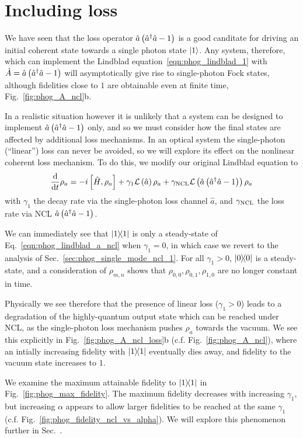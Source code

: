 \clearpage
\section{Including loss}
We have seen that the loss operator $\hat{a}\left(\hat{a}^\dagger \hat{a} - 1\right)$ is a good canditate for driving an initial coherent state towards a single photon state $\ket{1}$. Any system, therefore, which can implement the Lindblad equation~\ref{eqn:phog_lindblad_1} with $\hat{A} = \hat{a}\left(\hat{a}^\dagger \hat{a} - 1\right)$ will asymptotically give rise to single-photon Fock states, although fidelities close to $1$ are obtainable even at finite time, Fig.~\ref{fig:phog_A_ncl}b. 

In a realistic situation however it is unlikely that a system can be designed to implement $\hat{a}\left(\hat{a}^\dagger \hat{a} - 1\right)$ only, and so we must consider how the final states are affected by additional loss mechanisms. In an optical system the single-photon (``linear'') loss can never be avoided, so we will explore its effect on the nonlinear coherent loss mechanism.  To do this, we modify our original Lindblad equation to
\begin{equation}\label{eqn:phog_lindblad_a_ncl}
\frac{\mathrm{d}}{\mathrm{d}t} \rho_a =  - i \left[ \hat{H}, \rho_a\right] + \gamma_1 \mathcal{L}\left(\hat{a}\right)\rho_a + \gamma_{\text{NCL}} \mathcal{L}\left(\hat{a}\left(\hat{a}^\dagger \hat{a} - 1\right)\right)\rho_a
\end{equation}
with $\gamma_1$ the decay rate via the single-photon loss channel $\hat{a}$, and $\gamma_{\text{NCL}}$ the loss rate via NCL $\hat{a}\left(\hat{a}^\dagger \hat{a} - 1\right)$.

We can immediately see that $\dyad{1}$ is only a steady-state of Eq.~\ref{eqn:phog_lindblad_a_ncl} when $\gamma_1 = 0$, in which case we revert to the analysis of Sec.~\ref{sec:phog_single_mode_ncl_1}. For all $\gamma_1 > 0$, $\dyad{0}$ is a steady-state, and a consideration of $\rho_{m, n}$ shows that $\rho_{0, 0}, \rho_{0, 1}, \rho_{1, 0}$ are no longer constant in time. 

Physically we see therefore that the presence of linear loss ($\gamma_1 > 0$) leads to a degradation of the highly-quantum output state which can be reached under NCL, as the single-photon loss mechanism pushes $\rho_a$ towards the vacuum. We see this explicitly in Fig.~\ref{fig:phog_A_ncl_loss}b (c.f. Fig.~\ref{fig:phog_A_ncl}), where an intially increasing fidelity with $\dyad{1}$ eventually dies away, and fidelity to the vacuum state increases to $1$. 

We examine the maximum attainable fidelity to $\dyad{1}$ in Fig.~\ref{fig:phog_max_fidelity}. The maximum fidelity decreases with increasing $\gamma_1$, but increasing $\alpha$ appears to allow larger fidelities to be reached at the same $\gamma_1$ (c.f. Fig.~\ref{fig:phog_fidelity_ncl_vs_alpha}). We will explore this phenomenon further in Sec.~.




